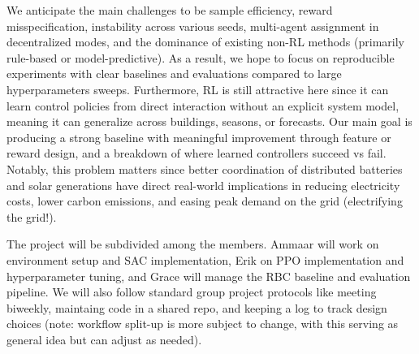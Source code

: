 \documentclass{article}
\begin{document}
We anticipate the main challenges to be sample efficiency, reward misspecification, instability across various seeds, multi-agent assignment in decentralized modes, and the dominance of existing non-RL methods (primarily rule-based or model-predictive). As a result, we hope to focus on reproducible experiments with clear baselines and evaluations compared to large hyperparameters sweeps. Furthermore, RL is still attractive here since it can learn control policies from direct interaction without an explicit system model, meaning it can generalize across buildings, seasons, or forecasts. Our main goal is producing a strong baseline with meaningful improvement through feature or reward design, and a breakdown of where learned controllers succeed vs fail. Notably, this problem matters since better coordination of distributed batteries and solar generations have direct real-world implications in reducing electricity costs, lower carbon emissions, and easing peak demand on the grid (electrifying the grid!).

The project will be subdivided among the members. Ammaar will work on environment setup and SAC implementation, Erik on PPO implementation and hyperparameter tuning, and Grace will manage the RBC baseline and evaluation pipeline. We will also follow standard group project protocols like meeting biweekly, maintaing code in a shared repo, and keeping a log to track design choices (note: workflow split-up is more subject to change, with this serving as general idea but can adjust as needed).


{\footnotesize


}
\end{document}
